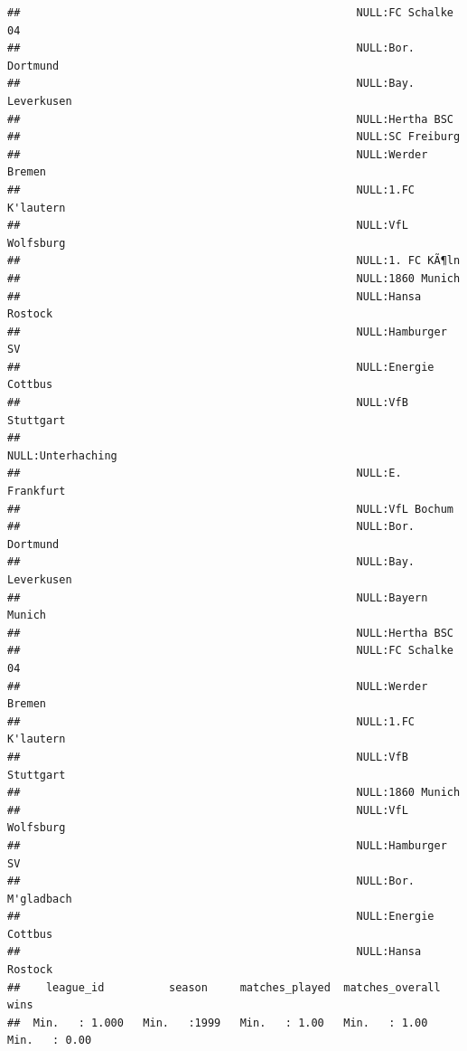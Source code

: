\documentclass{article}\usepackage[]{graphicx}\usepackage[]{color}
\makeatletter
\newenvironment{kframe}{%
 \def\at@end@of@kframe{}%
 \ifinner\ifhmode%
  \def\at@end@of@kframe{\end{minipage}}%
  \begin{minipage}{\columnwidth}%
 \fi\fi%
 \def\FrameCommand##1{\hskip\@totalleftmargin \hskip-\fboxsep
 \colorbox{shadecolor}{##1}\hskip-\fboxsep
     \hskip-\linewidth \hskip-\@totalleftmargin \hskip\columnwidth}%
 \MakeFramed {\advance\hsize-\width
   \@totalleftmargin\z@ \linewidth\hsize
   \@setminipage}}%
 {\par\unskip\endMakeFramed%
 \at@end@of@kframe}
\newenvironment{knitrout}{}{} %
\makeatother
\begin{document}
\begin{knitrout}
\begin{kframe}
\begin{verbatim}
##                                                    NULL:FC Schalke 04      
##                                                    NULL:Bor. Dortmund      
##                                                    NULL:Bay. Leverkusen    
##                                                    NULL:Hertha BSC         
##                                                    NULL:SC Freiburg        
##                                                    NULL:Werder Bremen      
##                                                    NULL:1.FC K'lautern     
##                                                    NULL:VfL Wolfsburg      
##                                                    NULL:1. FC KÃ¶ln        
##                                                    NULL:1860 Munich        
##                                                    NULL:Hansa Rostock      
##                                                    NULL:Hamburger SV       
##                                                    NULL:Energie Cottbus    
##                                                    NULL:VfB Stuttgart      
##                                                    NULL:Unterhaching       
##                                                    NULL:E. Frankfurt       
##                                                    NULL:VfL Bochum         
##                                                    NULL:Bor. Dortmund      
##                                                    NULL:Bay. Leverkusen    
##                                                    NULL:Bayern Munich      
##                                                    NULL:Hertha BSC         
##                                                    NULL:FC Schalke 04      
##                                                    NULL:Werder Bremen      
##                                                    NULL:1.FC K'lautern     
##                                                    NULL:VfB Stuttgart      
##                                                    NULL:1860 Munich        
##                                                    NULL:VfL Wolfsburg      
##                                                    NULL:Hamburger SV       
##                                                    NULL:Bor. M'gladbach    
##                                                    NULL:Energie Cottbus    
##                                                    NULL:Hansa Rostock      
##    league_id          season     matches_played  matches_overall      wins      
##  Min.   : 1.000   Min.   :1999   Min.   : 1.00   Min.   : 1.00   Min.   : 0.00  

\end{verbatim}
\end{kframe}
\end{knitrout}
\end{document}
